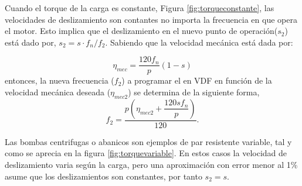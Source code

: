  Cuando el torque de la carga es constante, Figura \ref{fig:torqueconstante}, las velocidades de deslizamiento son contantes no importa la frecuencia en que opera el motor. Esto implica que el deslizamiento en el nuevo punto de operación($s_2$) está dado por, $s_2=s\cdot f_n/f_2$. Sabiendo que la velocidad mecánica está dada por:
 
 \begin{equation}
 	\eta_{mec}=\dfrac{120f_n}{p}(1-s)
\end{equation}
 entonces, la nueva frecuencia  ($f_2$) a programar el en VDF en función de la  velocidad mecánica deseada ($\eta_{mec2}$) se determina de la siguiente  forma,
 \begin{equation}
 f_2=\dfrac{p\left(\eta_{mec2}+ \dfrac{120sf_n}{p}\right) }{120}.
 \end{equation} 
 
 Las bombas centrifugas o abanicos  son ejemplos de par resistente variable, tal y como se aprecia en la figura \ref{fig:torquevariable}. En estos casos la velocidad de deslizamiento varia según la carga, pero una aproximación con error menor al 1\% asume que los deslizamientos son constantes, por tanto  $s_2=s$.
 
